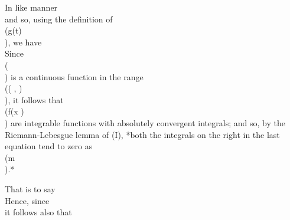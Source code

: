 In like manner
\\[ 
S_{m}^{(1)}(x)
=
\frac{1}{\pi}
\! \int_{0}^{\frac{1}{2} \pi}\!
\frac{\sin (2m+1)\theta}{\sin \theta}
g(x + 2\theta) \, d \theta
+
\frac{1}{\pi}
\! \int_{0}^{\frac{1}{2} \pi}\!
\frac{\sin (2m+1)\theta}{\sin \theta}
g(x - 2\theta) \, d \theta,
\\] 
and so, using the definition of \\(g(t)\\), we have
\\[ \begin{align*}
  S_{m}(x) - S_{m}^{(1)}(x)
  =&
  \frac{1}{\pi}
  \! \int_{\frac{1}{2}\delta}^{\frac{1}{2} \pi}\! \sin (2m+1)\theta
  \frac{f(x+2\theta)}{\sin \theta}
  \, d \theta
  \\
  &\quad
  \frac{1}{\pi}
  \! \int_{\frac{1}{2}\delta}^{\frac{1}{2} \pi}\! \sin (2m+1)\theta
  \frac{f(x-2\theta)}{\sin \theta}
  \, d \theta.
\end{align*} \\]

Since \\(\cosec\\) is a continuous function in the range \\(( \delta,  \pi)\\), it follows
that \\(f(x \theta) \cosec \theta\\) are integrable functions with absolutely
convergent integrals; and so, by the Riemann-Lebesgue lemma of
 (I), %
*both the integrals on the right in the last equation tend to zero
as \\(m \rightarrow \infty\\).*

That is to say
\\[ 
\lim_{m \rightarrow \infty}
\left\{
  S_{m}(x) - S_{m}^{(1)}(x)
\right\}
= 0.
\\] 

Hence, since
\\[ 
\lim_{m \rightarrow \infty}
S_{m}^{(1)}(x)
=
\frac{1}{2} \left\{
  f(x+0) + f(x-0)
\right\},
\\] 
it follows also that
\\[ 
\lim_{m \rightarrow \infty} S_{m}(x)
=
\frac{1}{2} \left\{
  f(x+0) + f(x-0)
\right\}.
\\] 

